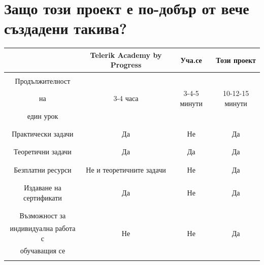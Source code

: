 \documentclass[12pt]{article}
\begin{document}
	\section{Защо този проект е по-добър от вече създадени такива?}
	\begin{table}[ht]
		\centering
		\resizebox{\textwidth}{!}
		{
			\begin{tabular}{c|c|c|c}
				& \foreignlanguage{english}{Telerik Academy by Progress} & Уча.се & Този проект\\
				\hline
				& & &\\
				Продължителност & & & \\ 
				на & 3-4 часа & 3-4-5 минути & 10-12-15 минути \\ 
				един урок & & &\\
				& & &\\
				\hline
				& & &\\
				Практически задачи & Да & Не & Да \\ 
				& & &\\
				\hline
				& & &\\
				Теоретични задачи & Да & Да & Да \\ 
				& & &\\
				\hline
				& & &\\
				Безплатни ресурси & Не и теоретичните задачи & Не & Да \\ 
				& & &\\
				\hline
				& & &\\
				Издаване на сертификати & Да & Не & Да \\
				& & &\\
				\hline
				& & &\\
				Възможност за & & & \\ 
				индивидуална работа с & Не & Не & Да \\
				обучаващия се & & &\\ 
				& & &\\
				\hline
				
				
			\end{tabular}
		}
	\end{table}
	\newpage
\end{document}
